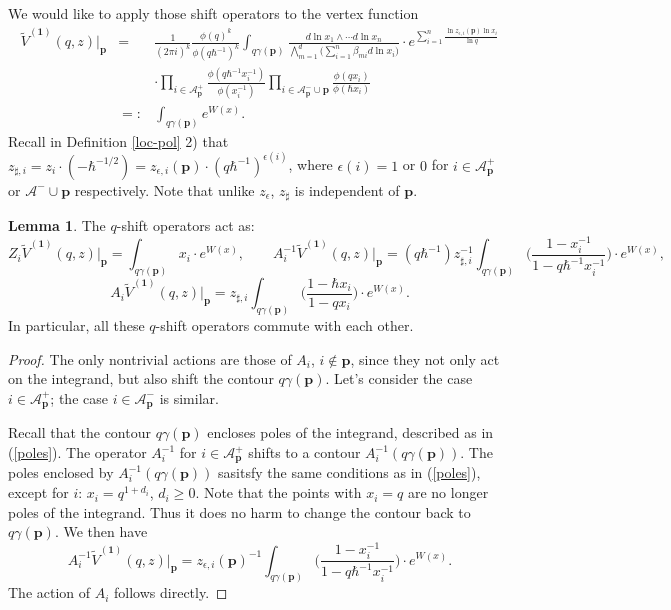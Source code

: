 \documentclass[10pt]{amsart}
\theoremstyle{definition}
\def\ben{\begin{eqnarray*}}
\def\een{\end{eqnarray*}}
\newcommand{\bp}{\mathbf{p}}
\newcommand{\bone}{\mathbf{1}}
\newcommand{\cA}{\mathcal{A}}
\theoremstyle{definition}
\numberwithin{equation}{section}
\theoremstyle{Theorem}
\newtheorem{Lemma}[Definition]{Lemma}
\begin{document}
We would like to apply those shift operators to the vertex function
\ben
\widetilde V^{(\bone)} (q,z) \big|_\bp
&=& \frac{1}{(2\pi i)^k} \frac{\phi(q)^k}{\phi(q \hbar^{-1})^k } \int_{q \gamma (\bp)} \frac{d\ln x_1 \wedge \cdots d\ln x_n}{\bigwedge_{m=1}^d \Big( \sum_{i=1}^n \beta_{mi} d\ln x_i \Big) } \cdot e^{\sum_{i=1}^n \frac{\ln z_{\epsilon,i} (\bp) \ln x_i }{\ln q} } \\
&& \cdot \prod_{i\in \cA_\bp^+} \frac{ \phi (q\hbar^{-1} x_i^{-1} ) }{ \phi (x_i^{-1} ) } \prod_{i\in \cA_\bp^- \cup \bp } \frac{\phi (q x_i)}{ \phi (\hbar x_i )}  \\
&=:& \int_{q \gamma (\bp )} e^{W(x)} .
\een
Recall in Definition \ref{loc-pol} 2) that $z_{\sharp, i} = z_i \cdot (-\hbar^{-1/2}) = z_{\epsilon, i} (\bp) \cdot (q\hbar^{-1})^{\epsilon (i)}$, where $\epsilon (i) = 1$ or $0$ for $i\in \cA_\bp^+$ or $\cA^- \cup \bp$ respectively. Note that unlike $z_\epsilon$, $z_\sharp$ is independent of $\bp$.

\begin{Lemma} \label{q-diff-operator}
The $q$-shift operators act as:
$$
Z_i \widetilde V^{(\bone)} (q,z) \big|_\bp =
 \int_{q \gamma (\bp)} x_i \cdot e^{W(x)} , \qquad
A_i^{-1} \widetilde V^{(\bone)} (q,z) \big|_\bp =
 (q\hbar^{-1}) z_{\sharp, i}^{-1} \int_{q \gamma (\bp)} \Big( \frac{1 - x_i^{-1} }{1 - q \hbar^{-1} x_i^{-1} } \Big) \cdot e^{W(x)} ,
 $$
 $$
 A_i \widetilde V^{(\bone)} (q,z) \big|_\bp =
 z_{\sharp, i}  \int_{q \gamma (\bp)} \Big( \frac{1 - \hbar x_i }{1 - q x_i } \Big) \cdot e^{W(x)}  .
$$
In particular, all these $q$-shift operators commute with each other.
\end{Lemma}

\begin{proof}
The only nontrivial actions are those of $A_i$, $i\not\in \bp$, since they not only act on the integrand, but also shift the contour $q \gamma(\bp)$. Let's consider the case $i\in \cA_\bp^+$; the case $i\in \cA_\bp^-$  is similar.

Recall that the contour $q \gamma (\bp)$ encloses poles of the integrand, described as in (\ref{poles}). The operator $A_i^{-1}$ for $i\in \cA_\bp^+$ shifts to a contour $A_i^{-1} (q \gamma (\bp) )$. The poles enclosed by $A_i^{-1} (q \gamma (\bp))$ sasitsfy the same conditions as in (\ref{poles}), except for $i$: $x_i = q^{1 + d_i}$, $d_i \geq 0$. Note that the points with $x_i = q$ are no longer poles of the integrand. Thus it does no harm to change the contour back to $q \gamma (\bp)$. We then have
$$
A_i^{-1} \widetilde V^{(\bone)} (q,z) \big|_\bp = z_{\epsilon, i} (\bp)^{-1} \int_{q \gamma (\bp)} \Big( \frac{1 - x_i^{-1}}{1 - q \hbar^{-1} x_i^{-1}} \Big) \cdot e^{W(x)} .
$$
The action of $A_i$ follows directly.
\end{proof}
\end{document}
